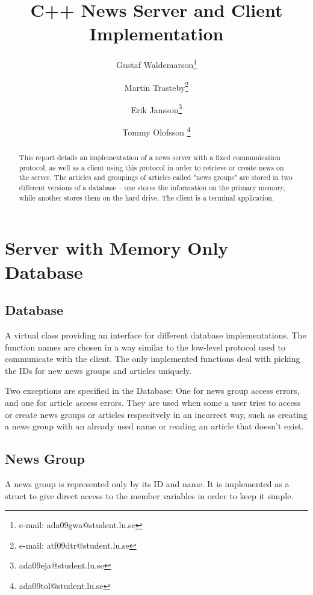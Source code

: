 \documentclass{acmsiggraph}               %
\title{C++ News Server and Client Implementation}
\author{Gustaf Waldemarson\thanks{e-mail: ada09gwa@student.lu.se}
\and Martin Trasteby\thanks{e-mail: atf09dtr@student.lu.se}
\and Erik Jansson\thanks{ada09eja@student.lu.se}
\and Tommy Olofsson \thanks{ada09tol@student.lu.se}}
\affiliation{Faculty of Engineering (LTH), Lund University \\ Sweden}
\begin{document}
\ifpdf
\else
\fi




\begin{abstract}
This report details an implementation of a news server with a fixed
communication protocol, as well as a client using this protocol in
order to retrieve or create news on the server. The articles and
groupings of articles called "news groups" are stored in two different
versions of a database -- one stores the information on the primary
memory, while another stores them on the hard drive. The client is a
terminal application.

\end{abstract}
\keywordlist

\section{Server with Memory Only Database}
\label{sec:smemdb}

\subsection{Database}
\label{ssec:database}
A virtual class providing an interface for different database implementations. The function names
are chosen in a way similar to the low-level protocol used to communicate with the client. The only 
implemented functions deal with picking the IDs for new news groups and articles uniquely. 

Two exceptions are specified in the Database: One for news group access errors, and one for article
access errors. They are used when some a user tries to access or create news groups or articles respecitvely in an incorrect way, such as creating a news group with an already used name or reading an article that doesn't exist.

\subsection{News Group}
\label{ssec:ng}
A news group is represented only by its ID and name. It is implemented as a struct to give direct
access to the member variables in order to keep it simple. 
\end{document}
